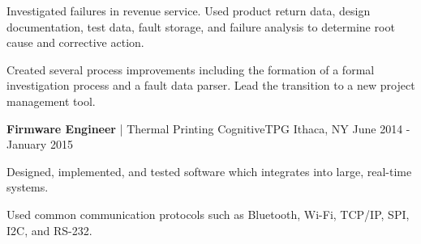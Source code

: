 \begin{cventries}
{\begin{cvitemstwo}
        \item {Investigated failures in revenue service. Used product return data, design documentation, test data, fault storage, and failure analysis to determine root cause and corrective action.}
        \item {Created several process improvements including the formation of a formal investigation process and a fault data parser. Lead the transition to a new project management tool.}
      \end{cvitemstwo}
    }
  \cventry
    {\textbf{Firmware Engineer} | Thermal Printing}
    {CognitiveTPG}
    {Ithaca, NY}
    {June 2014 - January 2015}
    {
      \begin{cvitems}
        \item {Designed, implemented, and tested software which integrates into large, real-time systems.}
        \item {Used common communication protocols such as Bluetooth, Wi-Fi, TCP/IP, SPI, I2C, and RS-232.}
      \end{cvitems}
    }
\end{cventries}